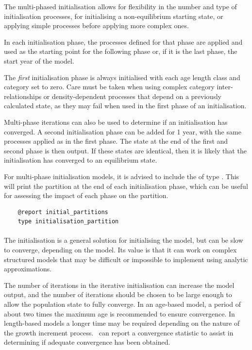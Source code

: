 The multi-phased initialisation allows for flexibility in the number and type of initialisation processes, for initialising a non-equilibrium starting state, or applying simple processes before applying more complex ones.

In each initialisation phase, the processes defined for that phase are applied and used as the starting point for the following phase or, if it is the last phase, the start year of the model.

The \emph{first} initialisation phase is always initialised with each \ifAgeBased age \else length class \fi and category set to zero. Care must be taken when using complex category inter-relationships or density-dependent processes that depend on a previously calculated state, as they may fail when used in the first phase of an initialisation.

Multi-phase iterations can also be used to determine if an initialisation has converged. A second initialisation phase can be added for 1 year, with the same processes applied as in the first phase. The state at the end of the first and second phase is then output. If these states are identical, then it is likely that the initialisation has converged to an equilibrium state.

For multi-phase initialisation models, it is advised to include the  of type . This will print the partition at the end of each initialisation phase, which can be useful for assessing the impact of each phase on the partition.

{\small{\begin{verbatim}
	@report initial_partitions
	type initialisation_partition
\end{verbatim}}}

\paragraph{}\label{sec:InitialisationPhase-Iterative}

The  initialisation is a general solution for initialising the model, but can be slow to converge, depending on the model. Its value is that it can work on complex structured models that may be difficult or impossible to implement using analytic approximations.

The number of iterations in the iterative initialisation can increase the model output, and the number of iterations should be chosen to be large enough to allow the population state to fully converge. In an age-based model, a period of about two times the maximum age is recommended to ensure convergence. In length-based models a longer time may be required depending on the nature of the growth increment process. \CNAME\ can report a convergence statistic to assist in determining if adequate convergence has been obtained.

